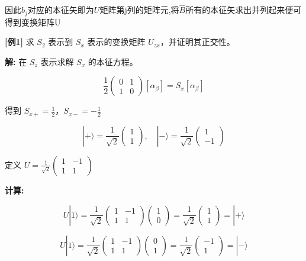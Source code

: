 \documentclass[lang=cn,10pt]{elegantbook}
\begin{document}
\begin{enumerate}
	因此$b_j$对应的本征矢即为$U$矩阵第j列的矩阵元,将$\hat{B}$所有的本征矢求出并列起来便可得到变换矩阵U
	
	\textbf{[例1]} 求 $S_2$ 表示到 $S_x$ 表示的变换矩阵 $U_{zx}$，并证明其正交性。
	
	\textbf{解:} 在 $S_z$ 表示求解 $S_x$ 的本征方程。
	
	\[
	\frac{1}{2} \begin{pmatrix} 0 & 1 \\ 1 & 0 \end{pmatrix} \left[ \alpha_\beta \right] = S_x \left[ \alpha_\beta \right]
	\]
	
	得到 $S_{x+} = \frac{1}{2}$，$S_{x-} = -\frac{1}{2}$
	
	\[
	| + \rangle = \frac{1}{\sqrt{2}} \begin{pmatrix} 1 \\ 1 \end{pmatrix}, \quad | - \rangle = \frac{1}{\sqrt{2}} \begin{pmatrix} 1 \\ -1 \end{pmatrix}
	\]
	
	定义 $U = \frac{1}{\sqrt{2}} \begin{pmatrix} 1 & -1 \\ 1 & 1 \end{pmatrix}$
	
	\textbf{计算:}
	
	\[
	U | 1 \rangle = \frac{1}{\sqrt{2}} \begin{pmatrix} 1 & -1 \\ 1 & 1 \end{pmatrix} \begin{pmatrix} 1 \\ 0 \end{pmatrix} = \frac{1}{\sqrt{2}} \begin{pmatrix} 1 \\ 1 \end{pmatrix} = | + \rangle
	\]
	
	\[
	U | 1 \rangle = \frac{1}{\sqrt{2}} \begin{pmatrix} 1 & -1 \\ 1 & 1 \end{pmatrix} \begin{pmatrix} 0 \\ 1 \end{pmatrix} = \frac{1}{\sqrt{2}} \begin{pmatrix} -1 \\ 1 \end{pmatrix} = | - \rangle
	\]
	

\end{enumerate}
\end{document}
